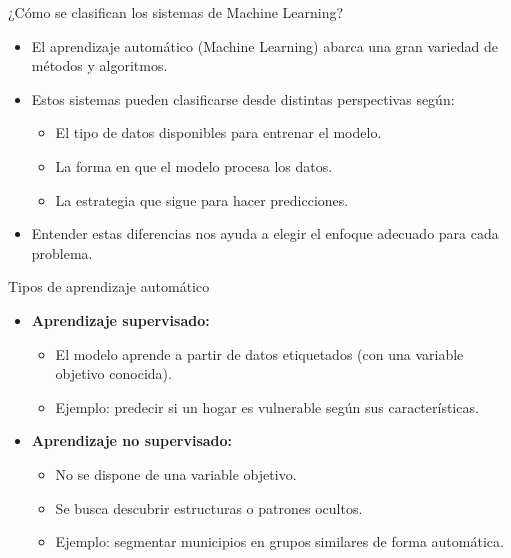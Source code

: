 \documentclass{beamer}
\begin{document}
\begin{frame}{¿Cómo se clasifican los sistemas de Machine Learning?}
	\begin{itemize}
		\item El aprendizaje automático (Machine Learning) abarca una gran variedad de métodos y algoritmos.
		\item Estos sistemas pueden clasificarse desde distintas perspectivas según:
		\begin{itemize}
			\item El tipo de datos disponibles para entrenar el modelo.
			\item La forma en que el modelo procesa los datos.
			\item La estrategia que sigue para hacer predicciones.
		\end{itemize}
		\item Entender estas diferencias nos ayuda a elegir el enfoque adecuado para cada problema.
	\end{itemize}
\end{frame}

\begin{frame}{Tipos de aprendizaje automático}
	\begin{itemize}
		\item \textbf{Aprendizaje supervisado:}
		\begin{itemize}
			\item El modelo aprende a partir de datos etiquetados (con una variable objetivo conocida).
			\item Ejemplo: predecir si un hogar es vulnerable según sus características.
		\end{itemize}
		
		\item \textbf{Aprendizaje no supervisado:}
		\begin{itemize}
			\item No se dispone de una variable objetivo.
			\item Se busca descubrir estructuras o patrones ocultos.
			\item Ejemplo: segmentar municipios en grupos similares de forma automática.
		\end{itemize}
	\end{itemize}
\end{frame}
\end{document}
